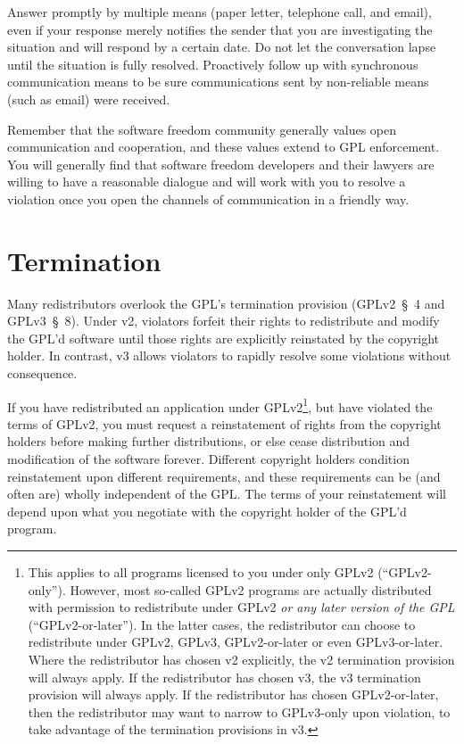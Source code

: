 Answer promptly by multiple means (paper letter, telephone call, and
email), even if your response merely notifies the sender that you are
investigating the situation and will respond by a certain date.  Do not
let the conversation lapse until the situation is fully resolved.
Proactively follow up with synchronous communication means to be sure
communications sent by non-reliable means (such as email) were received.

Remember that the software freedom community generally values open communication and
cooperation, and these values extend to GPL enforcement.  You will
generally find that software freedom developers and their lawyers are willing to
have a reasonable dialogue and will work with you to resolve a violation
once you open the channels of communication in a friendly way.

\section{Termination}

Many redistributors overlook the GPL's termination provision (GPLv2~\S~4 and
GPLv3~\S~8).  Under v2, violators forfeit their rights to redistribute and
modify the GPL'd software until those rights are explicitly reinstated by
the copyright holder.  In contrast, v3 allows violators to rapidly resolve
some violations without consequence.

If you have redistributed an application under GPLv2\footnote{This applies
  to all programs licensed to you under only GPLv2 (``GPLv2-only'').
  However, most so-called GPLv2 programs are actually distributed with
  permission to redistribute under GPLv2 \emph{or any later version of the
    GPL} (``GPLv2-or-later'').  In the latter cases, the redistributor can
  choose to redistribute under GPLv2, GPLv3, GPLv2-or-later or even
  GPLv3-or-later.  Where the redistributor has chosen v2 explicitly, the
  v2 termination provision will always apply.  If the redistributor has
  chosen v3, the v3 termination provision will always apply.  If the
  redistributor has chosen GPLv2-or-later, then the redistributor may want
  to narrow to GPLv3-only upon violation, to take advantage of the
  termination provisions in v3.}, but have violated the terms of GPLv2,
you must request a reinstatement of rights from the copyright holders
before making further distributions, or else cease distribution and
modification of the software forever.  Different copyright holders
condition reinstatement upon different requirements, and these
requirements can be (and often are) wholly independent of the GPL\@.  The
terms of your reinstatement will depend upon what you negotiate with the
copyright holder of the GPL'd program.

